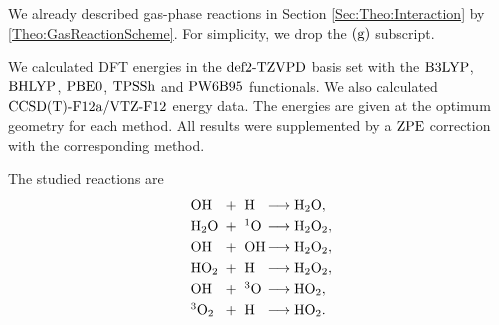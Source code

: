We already described gas-phase reactions in Section \ref{Sec:Theo:Interaction}
by \eqref{Theo:GasReactionScheme}. For simplicity, we drop the $(\text g)$ subscript.

We calculated DFT energies in the $\text{def2-TZVPD}$ basis set with
the $\text{B3LYP}$, $\text{BHLYP}$, $\text{PBE0}$, $\text{TPSSh}$ and $\text{PW6B95}$ 
functionals. We also calculated $\text{CCSD(T)-F12a}/\text{VTZ-F}12$ energy data. The energies are
given at the optimum geometry for each method. All results were supplemented by
a $\text{ZPE}$ correction with the corresponding method.





The studied reactions are
\newcommand\ronebox[1]{\makebox[.8cm][l]{\enmat{#1}}}
\newcommand\rtwobox[1]{\makebox[.7cm][l]{\ \enmat{#1}}}
\newcommand\prodbox[1]{\makebox[1.55cm][l]{\enmat{#1}}}
\begin{subequations}
\begin{align}
   \label{Gas:HO+H->H2O}
   \ronebox{\ho}+\rtwobox{\te{H}}\prodbox{\chemar\hto,} \\ 
   \label{Gas:H2O+O->H2O2}
   \ronebox{\hto}+\rtwobox{^1\te{O}}\prodbox{\chemar\htot,} \\
   \label{Gas:HO+HO->H2O2}
   \ronebox{\ho}+\rtwobox{\ho}\prodbox{\chemar\htot,} \\
   \label{Gas:HO2+H->H2O2}
   \ronebox{\hot}+\rtwobox{\te{H}}\prodbox{\chemar\htot,} \\
   \label{Gas:HO+O->HO2}
   \ronebox{\ho}+\rtwobox{^3\te{O}}\prodbox{\chemar\hot,} \\
   \label{Gas:3O2+H->HO2}
   \ronebox{^3\ot}+\rtwobox{\te{H}}\prodbox{\chemar\hot.}
\end{align}
\label{Gas:Reactions}
\end{subequations}



